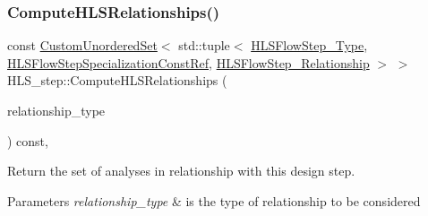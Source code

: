 \subsubsection{\texorpdfstring{Compute\+H\+L\+S\+Relationships()}{ComputeHLSRelationships()}}
{\footnotesize\ttfamily const \hyperlink{classCustomUnorderedSet}{Custom\+Unordered\+Set}$<$ std\+::tuple$<$ \hyperlink{hls__step_8hpp_ada16bc22905016180e26fc7e39537f8d}{H\+L\+S\+Flow\+Step\+\_\+\+Type}, \hyperlink{hls__step_8hpp_a5fdd2edf290c196531d21d68e13f0e74}{H\+L\+S\+Flow\+Step\+Specialization\+Const\+Ref}, \hyperlink{hls__step_8hpp_a3ad360b9b11e6bf0683d5562a0ceb169}{H\+L\+S\+Flow\+Step\+\_\+\+Relationship} $>$ $>$ H\+L\+S\+\_\+step\+::\+Compute\+H\+L\+S\+Relationships (\begin{DoxyParamCaption}\item[{const \hyperlink{classDesignFlowStep_a723a3baf19ff2ceb77bc13e099d0b1b7}{Design\+Flow\+Step\+::\+Relationship\+Type}}]{relationship\+\_\+type }\end{DoxyParamCaption}) const\hspace{0.3cm}{\ttfamily [protected]}, {\ttfamily [virtual]}}



Return the set of analyses in relationship with this design step. 


\begin{DoxyParams}{Parameters}
{\em relationship\+\_\+type} & is the type of relationship to be considered \\
\hline
\end{DoxyParams}


